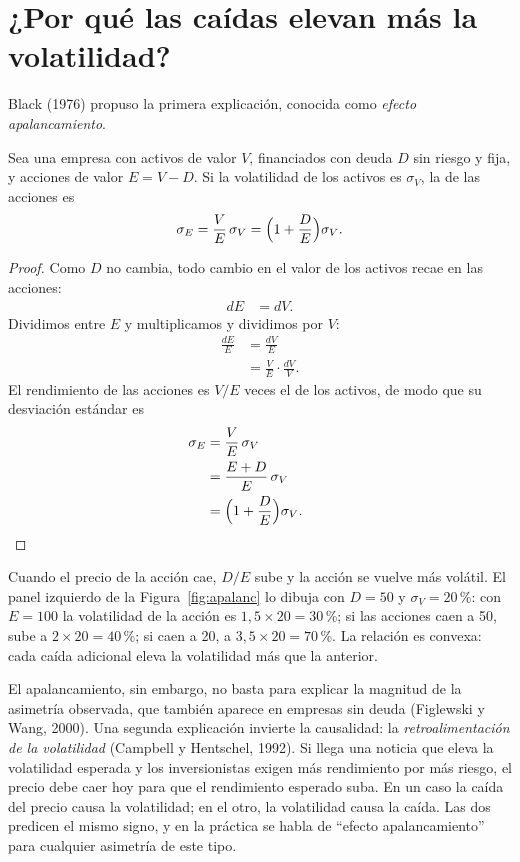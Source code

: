\section{¿Por qué las caídas elevan más la volatilidad?}

Black (1976) propuso la primera explicación, conocida como \emph{efecto apalancamiento}.

\begin{proposicion}\label{prop:black}
Sea una empresa con activos de valor $V$, financiados con deuda $D$ sin riesgo y fija, y acciones de valor
$E=V-D$. Si la volatilidad de los activos es $\sigma_V$, la de las acciones es
\[
  \sigma_E=\frac{V}{E}\,\sigma_V=\Bigl(1+\frac DE\Bigr)\sigma_V .
\]
\end{proposicion}

\begin{proof}
Como $D$ no cambia, todo cambio en el valor de los activos recae en las acciones:
\begin{align*}
  dE &= dV .
\end{align*}
Dividimos entre $E$ y multiplicamos y dividimos por $V$:
\begin{align*}
  \frac{dE}{E} &= \frac{dV}{E}\\
               &= \frac VE\cdot\frac{dV}{V}.
\end{align*}
El rendimiento de las acciones es $V/E$ veces el de los activos, de modo que su desviación estándar es
\begin{align*}
  \sigma_E &= \frac VE\,\sigma_V\\
           &= \frac{E+D}{E}\,\sigma_V\\
           &= \Bigl(1+\frac DE\Bigr)\sigma_V . && \qedhere
\end{align*}
\end{proof}

Cuando el precio de la acción cae, $D/E$ sube y la acción se vuelve más volátil. El panel izquierdo de la
Figura~\ref{fig:apalanc} lo dibuja con $D=50$ y $\sigma_V=20$\,\%: con $E=100$ la volatilidad de la acción es
$1{,}5\times20=30$\,\%; si las acciones caen a 50, sube a $2\times20=40$\,\%; si caen a 20, a
$3{,}5\times20=70$\,\%. La relación es convexa: cada caída adicional eleva la volatilidad más que la anterior.

El apalancamiento, sin embargo, no basta para explicar la magnitud de la asimetría observada, que también
aparece en empresas sin deuda (Figlewski y Wang, 2000). Una segunda explicación invierte la causalidad: la
\emph{retroalimentación de la volatilidad} (Campbell y Hentschel, 1992). Si llega una noticia que eleva la
volatilidad esperada y los inversionistas exigen más rendimiento por más riesgo, el precio debe caer hoy para
que el rendimiento esperado suba. En un caso la caída del precio causa la volatilidad; en el otro, la
volatilidad causa la caída. Las dos predicen el mismo signo, y en la práctica se habla de ``efecto
apalancamiento'' para cualquier asimetría de este tipo.

